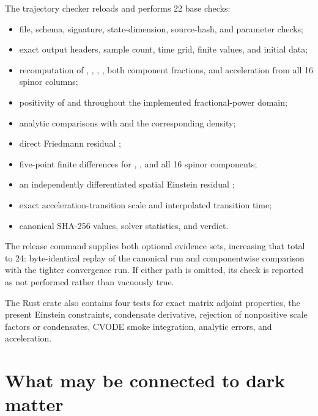 \documentclass[11pt]{article}
\begin{document}
The trajectory checker reloads \texttt{} and performs 22 base checks:

\begin{itemize}
\item file, schema, signature, state-dimension, source-hash, and parameter checks;
\item exact output headers, sample count, time grid, finite values, and initial data;
\item recomputation of \texttt{}, \texttt{}, \texttt{}, \texttt{}, both component fractions, and
acceleration from all 16 spinor columns;

\item positivity of \texttt{} and \texttt{} throughout the implemented fractional-power domain;
\item analytic comparisons with \texttt{} and the corresponding density;
\item direct Friedmann residual \texttt{};
\item five-point finite differences for \texttt{}, \texttt{}, and all 16 spinor components;
\item an independently differentiated spatial Einstein residual
\texttt{};

\item exact acceleration-transition scale and interpolated transition time;
\item canonical SHA-256 values, solver statistics, and verdict.
\end{itemize}

The release command supplies both optional evidence sets, increasing that total to 24: byte-identical replay of the canonical run and componentwise comparison with the tighter convergence run. If either path is omitted, its check is reported as not performed rather than vacuously true.

The Rust crate also contains four tests for exact matrix adjoint properties, the present Einstein constraints, condensate derivative, rejection of nonpositive scale factors or condensates, CVODE smoke integration, analytic errors, and acceleration.

\section{What may be connected to dark matter}
\end{document}
